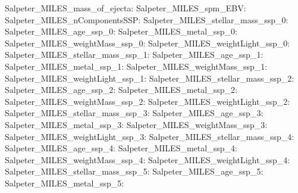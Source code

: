 Salpeter\_MILES\_mass\_of\_ejecta:  \newline 
Salpeter\_MILES\_spm\_EBV:  \newline 
Salpeter\_MILES\_nComponentsSSP:  \newline 
Salpeter\_MILES\_stellar\_mass\_ssp\_0:  \newline 
Salpeter\_MILES\_age\_ssp\_0:  \newline 
Salpeter\_MILES\_metal\_ssp\_0:  \newline 
Salpeter\_MILES\_weightMass\_ssp\_0:  \newline 
Salpeter\_MILES\_weightLight\_ssp\_0:  \newline 
Salpeter\_MILES\_stellar\_mass\_ssp\_1:  \newline 
Salpeter\_MILES\_age\_ssp\_1:  \newline 
Salpeter\_MILES\_metal\_ssp\_1:  \newline 
Salpeter\_MILES\_weightMass\_ssp\_1:  \newline 
Salpeter\_MILES\_weightLight\_ssp\_1:  \newline 
Salpeter\_MILES\_stellar\_mass\_ssp\_2:  \newline 
Salpeter\_MILES\_age\_ssp\_2:  \newline 
Salpeter\_MILES\_metal\_ssp\_2:  \newline 
Salpeter\_MILES\_weightMass\_ssp\_2:  \newline 
Salpeter\_MILES\_weightLight\_ssp\_2:  \newline 
Salpeter\_MILES\_stellar\_mass\_ssp\_3:  \newline 
Salpeter\_MILES\_age\_ssp\_3:  \newline 
Salpeter\_MILES\_metal\_ssp\_3:  \newline 
Salpeter\_MILES\_weightMass\_ssp\_3:  \newline 
Salpeter\_MILES\_weightLight\_ssp\_3:  \newline 
Salpeter\_MILES\_stellar\_mass\_ssp\_4:  \newline 
Salpeter\_MILES\_age\_ssp\_4:  \newline 
Salpeter\_MILES\_metal\_ssp\_4:  \newline 
Salpeter\_MILES\_weightMass\_ssp\_4:  \newline 
Salpeter\_MILES\_weightLight\_ssp\_4:  \newline 
Salpeter\_MILES\_stellar\_mass\_ssp\_5:  \newline 
Salpeter\_MILES\_age\_ssp\_5:  \newline 
Salpeter\_MILES\_metal\_ssp\_5:  \newline 
